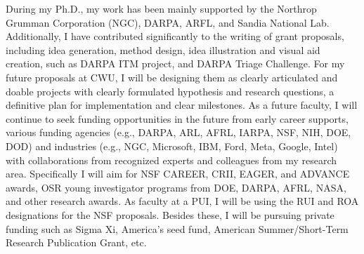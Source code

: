 
%


During my Ph.D., my work has been mainly supported by the Northrop Grumman Corporation (NGC), 
DARPA, ARFL, and Sandia National Lab. 
Additionally, I have contributed significantly to the writing of grant proposals, including idea
generation, method design, idea illustration and visual aid creation, such as 
DARPA ITM project, and DARPA Triage Challenge.
For my future proposals at CWU, I will be designing them as clearly articulated and doable projects with clearly formulated hypothesis and research questions, a definitive plan for implementation and clear milestones. 
As a future faculty, I will continue to seek funding opportunities in the future from early career supports, various funding agencies (e.g., DARPA, ARL, AFRL, IARPA, NSF, NIH, DOE, DOD) and industries (e.g., NGC, Microsoft, IBM, Ford, Meta, Google, Intel) with collaborations from recognized experts and colleagues from my research area.
Specifically I will aim for NSF CAREER, CRII, EAGER, and ADVANCE awards, OSR young investigator programs from DOE, DARPA, AFRL, NASA, and other research awards. As faculty at a PUI, I will be using the RUI and ROA designations for the NSF proposals. Besides these, I will be pursuing private funding such as Sigma Xi, America's seed fund, American Summer/Short-Term Research Publication Grant, etc.










